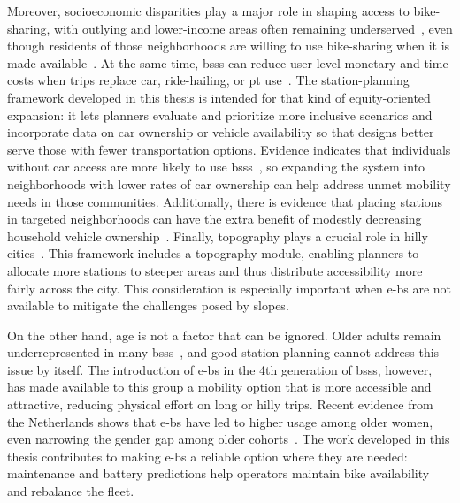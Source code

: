 Moreover, socioeconomic disparities play a major role in shaping access to bike-sharing, with outlying and lower-income areas often remaining underserved~\cite{Ogilvie2012, Goodman2014, Willberg2021}, even though residents of those neighborhoods are willing to use bike-sharing when it is made available~\cite{Yu2024}. At the same time, \acp{bss} can reduce user-level monetary and time costs when trips replace car, ride-hailing, or \ac{pt} use~\cite{Qiu2018, Bullock2017, Woodcock2014}. The station-planning framework developed in this thesis is intended for that kind of equity-oriented expansion: it lets planners evaluate and prioritize more inclusive scenarios and incorporate data on car ownership or vehicle availability so that designs better serve those with fewer transportation options. Evidence indicates that individuals without car access are more likely to use \acp{bss}~\cite{Mohiuddin2024, Yu2024}, so expanding the system into neighborhoods with lower rates of car ownership can help address unmet mobility needs in those communities. Additionally, there is evidence that placing stations in targeted neighborhoods can have the extra benefit of modestly decreasing household vehicle ownership~\cite{Basu2021}. Finally, topography plays a crucial role in hilly cities~\cite{Midgley2011, MateoBabiano2016, Morency2015}. This framework includes a topography module, enabling planners to allocate more stations to steeper areas and thus distribute accessibility more fairly across the city. This consideration is especially important when \acp{e-b} are not available to mitigate the challenges posed by slopes.

On the other hand, age is not a factor that can be ignored. Older adults remain underrepresented in many \acp{bss}~\cite{Yu2024, Willberg2021}, and good station planning cannot address this issue by itself. The introduction of \acp{e-b} in the 4th generation of \acp{bss}, however, has made available to this group a mobility option that is more accessible and attractive, reducing physical effort on long or hilly trips. Recent evidence from the Netherlands shows that \acp{e-b} have led to higher usage among older women, even narrowing the gender gap among older cohorts~\cite{Huang2024}. The work developed in this thesis contributes to making \acp{e-b} a reliable option where they are needed: maintenance and battery predictions help operators maintain bike availability and rebalance the fleet. 

